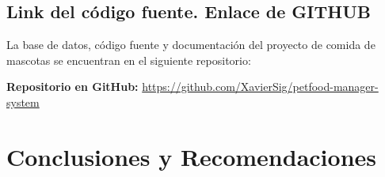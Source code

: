\documentclass[11pt,a4paper]{article}
\begin{document}
\subsection{Link del código fuente. Enlace de GITHUB}
La base de datos, código fuente y documentación del proyecto de comida de mascotas se encuentran en el siguiente repositorio:
\begin{center}
    \textbf{Repositorio en GitHub:} \url{https://github.com/XavierSig/petfood-manager-system}
\end{center}

\section{Conclusiones y Recomendaciones}
\end{document}
